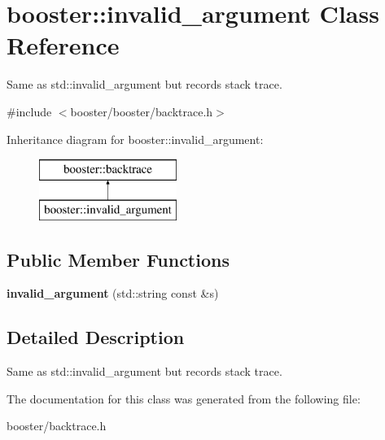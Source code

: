 \section{booster\-:\-:invalid\-\_\-argument \-Class \-Reference}
\label{classbooster_1_1invalid__argument}


\-Same as std\-::invalid\-\_\-argument but records stack trace.  




{\ttfamily \#include $<$booster/booster/backtrace.\-h$>$}

\-Inheritance diagram for booster\-:\-:invalid\-\_\-argument\-:\begin{figure}[H]
\begin{center}
\leavevmode
\includegraphics[height=2.000000cm]{classbooster_1_1invalid__argument}
\end{center}
\end{figure}
\subsection*{\-Public \-Member \-Functions}
\begin{DoxyCompactItemize}
\item 
{\bfseries invalid\-\_\-argument} (std\-::string const \&s)\label{classbooster_1_1invalid__argument_a51dd0443006b5636515ff1e38dccc6a6}

\end{DoxyCompactItemize}


\subsection{\-Detailed \-Description}
\-Same as std\-::invalid\-\_\-argument but records stack trace. 

\-The documentation for this class was generated from the following file\-:\begin{DoxyCompactItemize}
\item 
booster/backtrace.\-h\end{DoxyCompactItemize}
